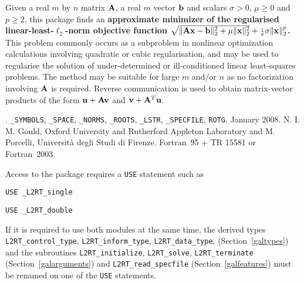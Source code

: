 \documentclass{galahad}
\newcommand{\packagename}{L2\-RT}
\newcommand{\fullpackagename}{\libraryname\_\packagename}
\begin{document}
\galheader


\galsummary
Given a real $m$ by $n$ matrix ${\mathbf{A}}$, 
a real $m$ vector ${\mathbf{b}}$ and scalars $\sigma>0$, $\mu \geq 0$ and $p \geq 2$, 
this package finds an  
{\bf approximate minimizer of the regularised linear-least-$\ell_2$-norm
objective function  
$\sqrt{\| {\mathbf{A}} {\mathbf{x}} - {\mathbf{b}}\|_2^2 + \mu \| {\mathbf{x}} \|_2^2} 
 + {\scriptstyle \frac{1}{p}} \sigma \| {\mathbf{x}} \|_2^p$.}
This problem commonly occurs as a subproblem in nonlinear 
optimization calculations involving quadratic or cubic regularisation,
and may be used to regularise the solution 
of under-determined or ill-conditioned linear least-squares problems.
The method may be suitable for large $m$ and/or $n$ as no factorization 
involving ${\mathbf{A}}$ is required. Reverse communication is used to obtain  
matrix-vector products of the form ${\mathbf{u}} + {\mathbf{A}} {\mathbf{v}}$ and
${\mathbf{v}} + {\mathbf{A}}^T {\mathbf{u}}$.


\galattributes
\galversions{\tt  \fullpackagename\_single, \fullpackagename\_double}.
\galuses 
{\tt \libraryname\_SY\-M\-BOLS}, 
{\tt \libraryname\_SPACE}, {\tt \libraryname\_\-NORMS}, 
{\tt \libraryname\_ROOTS}, {\tt \libraryname\_LSTR},
{\tt \libraryname\_SPECFILE},
{\tt *ROTG}.
\galdate January 2008.
\galorigin N. I. M. Gould, Oxford University and Rutherford Appleton Laboratory
 and M. Porcelli, Universit\`{a} degli Studi di Firenze.
\gallanguage Fortran~95 + TR 15581 or Fortran~2003. 


\galhowto

Access to the package requires a {\tt USE} statement such as

\medskip{}

\hskip0.5in {\tt USE \fullpackagename\_single}

\medskip{}

\hskip0.5in {\tt USE  \fullpackagename\_double}

\medskip

\noindent
If it is required to use both modules at the same time, the derived types 
{\tt \packagename\_control\_type}, {\tt \packagename\_inform\_type}, 
{\tt \packagename\_data\_type},
(Section~\ref{galtypes})
and the subroutines
{\tt \packagename\_initialize},  
{\tt \packagename\_solve}, {\tt \packagename\_terminate}
(Section~\ref{galarguments})
and 
{\tt \packagename\_read\_specfile}
(Section~\ref{galfeatures})
must be renamed on one of the {\tt USE} statements.
\end{document}

